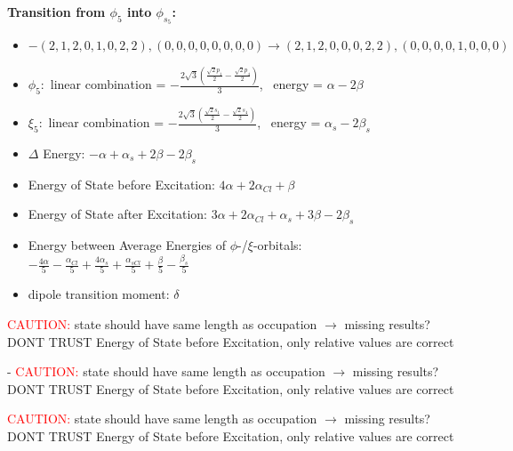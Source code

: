 \documentclass[12pt,a4paper]{article}
\begin{document}
        \noindent\textbf{Transition from $\phi_{5}$ into $\phi_{s_{5}}$:}
        \begin{itemize}
            \item $- (2, 1, 2, 0, 1, 0, 2, 2), (0, 0, 0, 0, 0, 0, 0, 0) \rightarrow (2, 1, 2, 0, 0, 0, 2, 2), (0, 0, 0, 0, 1, 0, 0, 0)$
        
            \item $\phi_{5}:$ linear combination = $- \frac{2 \sqrt{3} \left(\frac{\sqrt{2} p_{1}}{2} - \frac{\sqrt{2} p_{4}}{2}\right)}{3}$, \
            energy = $\alpha - 2 \beta$
            
            \item $\xi_{5}:$ linear combination = $- \frac{2 \sqrt{3} \left(\frac{\sqrt{2} s_{1}}{2} - \frac{\sqrt{2} s_{4}}{2}\right)}{3}$, \
            energy = $\alpha_{s} - 2 \beta_{s}$
            
            \item $\Delta$ Energy: $- \alpha + \alpha_{s} + 2 \beta - 2 \beta_{s}$
            \item Energy of State before Excitation: $4 \alpha + 2 \alpha_{Cl} + \beta$
            \item Energy of State after Excitation: $3 \alpha + 2 \alpha_{Cl} + \alpha_{s} + 3 \beta - 2 \beta_{s}$
            \item Energy between Average Energies of $\phi$-/$\xi$-orbitals: \
            $- \frac{4 \alpha}{5} - \frac{\alpha_{Cl}}{5} + \frac{4 \alpha_{s}}{5} + \frac{\alpha_{s Cl}}{5} + \frac{\beta}{5} - \frac{\beta_{s}}{5}$
        
            \item dipole transition moment: $\delta$
        
        \end{itemize}
        
	\textcolor{red}{CAUTION:} state should have same length as occupation $\rightarrow$ missing results?
	DONT TRUST \glqq{}Energy of State before Excitation\grqq{}, only relative values are correct

 - 	\textcolor{red}{CAUTION:} state should have same length as occupation $\rightarrow$ missing results?
	DONT TRUST \glqq{}Energy of State before Excitation\grqq{}, only relative values are correct

	\textcolor{red}{CAUTION:} state should have same length as occupation $\rightarrow$ missing results?
	DONT TRUST \glqq{}Energy of State before Excitation\grqq{}, only relative values are correct
\end{document}

